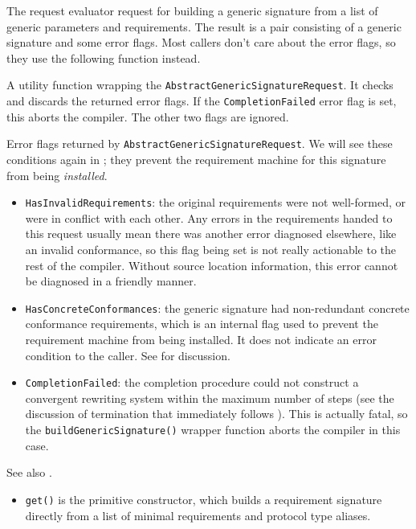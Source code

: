 \documentclass[../generics]{subfiles}
\begin{document}
The request evaluator request for building a generic signature from a list of generic parameters and requirements. The result is a pair consisting of a generic signature and some error flags. Most callers don't care about the error flags, so they use the following function instead.

A utility function wrapping the \texttt{AbstractGenericSignatureRequest}. It checks and discards the returned error flags. If the \texttt{CompletionFailed} error flag is set, this aborts the compiler. The other two flags are ignored.

Error flags returned by \texttt{AbstractGenericSignatureRequest}. We will see these conditions again in ; they prevent the requirement machine for this signature from being \emph{installed}.
\begin{itemize}
\item \texttt{HasInvalidRequirements}: the original requirements were not well-formed, or were in conflict with each other. Any errors in the requirements handed to this request usually mean there was another error diagnosed elsewhere, like an invalid conformance, so this flag being set is not really actionable to the rest of the compiler. Without source location information, this error cannot be diagnosed in a friendly manner.
\item \texttt{HasConcreteConformances}: the generic signature had non-redundant concrete conformance requirements, which is an internal flag used to prevent the requirement machine from being installed. It does not indicate an error condition to the caller. See  for discussion.
\item \texttt{CompletionFailed}: the completion procedure could not construct a convergent rewriting system within the maximum number of steps (see the discussion of termination that immediately follows ). This is actually fatal, so the \texttt{buildGenericSignature()} wrapper function aborts the compiler in this case.
\end{itemize}

See also .
\begin{itemize}
\item \texttt{get()} is the primitive constructor, which builds a requirement signature directly from a list of minimal requirements and protocol type aliases.
\end{itemize}
\end{document}
